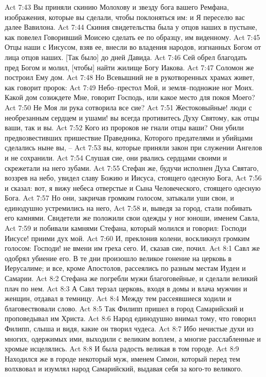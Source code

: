 Act 7:43  Вы приняли скинию Молохову и звезду бога вашего Ремфана, изображения, которые вы сделали, чтобы поклоняться им: и Я переселю вас далее Вавилона.
Act 7:44  Скиния свидетельства была у отцов наших в пустыне, как повелел Говоривший Моисею сделать ее по образцу, им виденному.
Act 7:45  Отцы наши с Иисусом, взяв ее, внесли во владения народов, изгнанных Богом от лица отцов наших. [Так было] до дней Давида.
Act 7:46  Сей обрел благодать пред Богом и молил, [чтобы] найти жилище Богу Иакова.
Act 7:47  Соломон же построил Ему дом.
Act 7:48  Но Всевышний не в рукотворенных храмах живет, как говорит пророк:
Act 7:49  Небо--престол Мой, и земля--подножие ног Моих. Какой дом созиждете Мне, говорит Господь, или какое место для покоя Моего?
Act 7:50  Не Моя ли рука сотворила все сие?
Act 7:51  Жестоковыйные! люди с необрезанным сердцем и ушами! вы всегда противитесь Духу Святому, как отцы ваши, так и вы.
Act 7:52  Кого из пророков не гнали отцы ваши? Они убили предвозвестивших пришествие Праведника, Которого предателями и убийцами сделались ныне вы, --
Act 7:53  вы, которые приняли закон при служении Ангелов и не сохранили.
Act 7:54  Слушая сие, они рвались сердцами своими и скрежетали на него зубами.
Act 7:55  Стефан же, будучи исполнен Духа Святаго, воззрев на небо, увидел славу Божию и Иисуса, стоящего одесную Бога,
Act 7:56  и сказал: вот, я вижу небеса отверстые и Сына Человеческого, стоящего одесную Бога.
Act 7:57  Но они, закричав громким голосом, затыкали уши свои, и единодушно устремились на него,
Act 7:58  и, выведя за город, стали побивать его камнями. Свидетели же положили свои одежды у ног юноши, именем Савла,
Act 7:59  и побивали камнями Стефана, который молился и говорил: Господи Иисусе! приими дух мой.
Act 7:60  И, преклонив колени, воскликнул громким голосом: Господи! не вмени им греха сего. И, сказав сие, почил.
Act 8:1  Савл же одобрял убиение его. В те дни произошло великое гонение на церковь в Иерусалиме; и все, кроме Апостолов, рассеялись по разным местам Иудеи и Самарии.
Act 8:2  Стефана же погребли мужи благоговейные, и сделали великий плач по нем.
Act 8:3  А Савл терзал церковь, входя в домы и влача мужчин и женщин, отдавал в темницу.
Act 8:4  Между тем рассеявшиеся ходили и благовествовали слово.
Act 8:5  Так Филипп пришел в город Самарийский и проповедывал им Христа.
Act 8:6  Народ единодушно внимал тому, что говорил Филипп, слыша и видя, какие он творил чудеса.
Act 8:7  Ибо нечистые духи из многих, одержимых ими, выходили с великим воплем, а многие расслабленные и хромые исцелялись.
Act 8:8  И была радость великая в том городе.
Act 8:9  Находился же в городе некоторый муж, именем Симон, который перед тем волхвовал и изумлял народ Самарийский, выдавая себя за кого-то великого.

